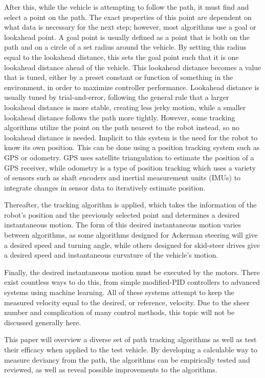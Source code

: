 \documentclass[mla7]{mla}
\begin{document}
\begin{paper}
After this, while the vehicle is attempting to follow the path, it must find and select a point on the path. The exact properties of this point are dependent on what data is necessary for the next step; however, most algorithms use a goal or lookahead point. A goal point is usually defined as a point that is both on the path and on a circle of a set radius around the vehicle. By setting this radius equal to the lookahead distance, this sets the goal point such that it is one lookahead distance ahead of the vehicle. This lookahead distance becomes a value that is tuned, either by a preset constant or function of something in the environment, in order to maximize controller performance. Lookahead distance is usually tuned by trial-and-error, following the general rule that a larger lookahead distance is more stable, creating less jerky motion, while a smaller lookahead distance follows the path more tightly. However, some tracking algorithms utilize the point on the path nearest to the robot instead, so no lookahead distance is needed. Implicit to this system is the need for the robot to know its own position. This can be done using a position tracking system such as GPS or odometry. GPS uses satellite triangulation to estimate the position of a GPS receiver, while odometry is a type of position tracking which uses a variety of sensors such as shaft encoders and inertial measurement units (IMUs) to integrate changes in sensor data to iteratively estimate position.

Thereafter, the tracking algorithm is applied, which takes the information of the robot's position and the previously selected point and determines a desired instantaneous motion. The form of this desired instantaneous motion varies between algorithms, as some algorithms designed for Ackerman steering will give a desired speed and turning angle, while others designed for skid-steer drives give a desired speed and instantaneous curvature of the vehicle's motion.

Finally, the desired instantaneous motion must be executed by the motors. There exist countless ways to do this, from simple modified-PID controllers to advanced systems using machine learning. All of these systems attempt to keep the measured velocity equal to the desired, or reference, velocity. Due to the sheer number and complication of many control methods, this topic will not be discussed generally here.

This paper will overview a diverse set of path tracking algorithms as well as test their efficacy when applied to the test vehicle. By developing a calculable way to measure deviancy from the path, the algorithms can be empirically tested and reviewed, as well as reveal possible improvements to the algorithms. 


\end{paper}
\end{document}
